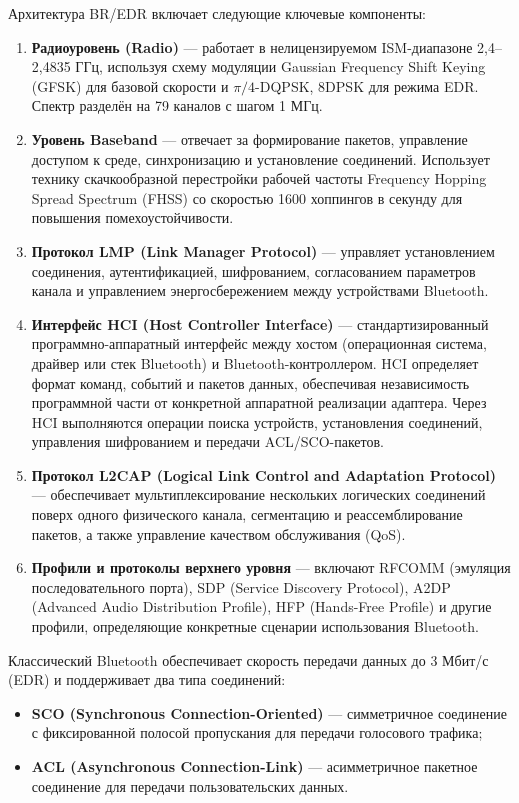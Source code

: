 Архитектура BR/EDR включает следующие ключевые компоненты:
\begin{enumerate}[nosep]
    \item \textbf{Радиоуровень (Radio)} --- работает в нелицензируемом ISM-диапазоне 2{,}4--2{,}4835 ГГц, используя схему модуляции Gaussian Frequency Shift Keying (GFSK) для базовой скорости и $\pi/4$-DQPSK, 8DPSK для режима EDR. Спектр разделён на 79 каналов с шагом 1 МГц.

    \item \textbf{Уровень Baseband} --- отвечает за формирование пакетов, управление доступом к среде, синхронизацию и установление соединений. Использует технику скачкообразной перестройки рабочей частоты Frequency Hopping Spread Spectrum (FHSS) со скоростью 1600 хоппингов в секунду для повышения помехоустойчивости.

    \item \textbf{Протокол LMP (Link Manager Protocol)} --- управляет установлением соединения, аутентификацией, шифрованием, согласованием параметров канала и управлением энергосбережением между устройствами Bluetooth.

    \item \textbf{Интерфейс HCI (Host Controller Interface)} --- стандартизированный программно-аппаратный интерфейс между хостом (операционная система, драйвер или стек Bluetooth) и Bluetooth-контроллером. HCI определяет формат команд, событий и пакетов данных, обеспечивая независимость программной части от конкретной аппаратной реализации адаптера. Через HCI выполняются операции поиска устройств, установления соединений, управления шифрованием и передачи ACL/SCO-пакетов.

    \item \textbf{Протокол L2CAP (Logical Link Control and Adaptation Protocol)} --- обеспечивает мультиплексирование нескольких логических соединений поверх одного физического канала, сегментацию и реассемблирование пакетов, а также управление качеством обслуживания (QoS).

    \item \textbf{Профили и протоколы верхнего уровня} --- включают RFCOMM (эмуляция последовательного порта), SDP (Service Discovery Protocol), A2DP (Advanced Audio Distribution Profile), HFP (Hands-Free Profile) и другие профили, определяющие конкретные сценарии использования Bluetooth.
\end{enumerate}

Классический Bluetooth обеспечивает скорость передачи данных до 3 Мбит/с (EDR) и поддерживает два типа соединений:
\begin{itemize}[nosep]
    \item \textbf{SCO (Synchronous Connection-Oriented)} --- симметричное соединение с фиксированной полосой пропускания для передачи голосового трафика;
    
    \item \textbf{ACL (Asynchronous Connection-Link)} --- асимметричное пакетное соединение для передачи пользовательских данных.
\end{itemize}

